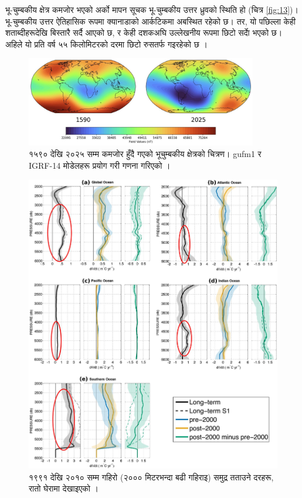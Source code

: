 \documentclass[10pt,twocolumn,letterpaper]{article}
\begin{document}
भू-चुम्बकीय क्षेत्र कमजोर भएको अर्को मापन सूचक भू-चुम्बकीय उत्तर ध्रुवको स्थिति हो (चित्र \ref{fig:13})। भू-चुम्बकीय उत्तर ऐतिहासिक रूपमा क्यानाडाको आर्कटिकमा अबस्थित रहेको छ। तर, यो पछिल्ला केही शताब्दीहरूदेखि बिस्तारै सर्दै आएको छ, र केही दशकअघि उल्लेखनीय रूपमा छिटो सर्दाे भएको छ। अहिले यो प्रति वर्ष ५५ किलोमिटरको दरमा छिटो रुसतर्फ गइरहेको छ \cite{124}।

\begin{figure}[t]
\begin{center}
\includegraphics[width=0.9\textwidth]{saa.jpg}
\end{center}
   \caption{१५९० देखि २०२५ सम्म कमजोर हुँदै गएको भूचुम्बकीय क्षेत्रको चित्रण। gufm1 र IGRF-14 मोडेलहरू प्रयोग गरी गणना गरिएको \cite{125,126}।}
\label{fig:14}
\end{figure}

\begin{figure}[t]
\begin{center}
   \includegraphics[width=1\linewidth]{ocean-highlight.jpg}
\end{center}
   \caption{१९९१ देखि २०१० सम्म गहिरो (२००० मिटरभन्दा बढी गहिराइ) समुद्र तताउने दरहरू, रातो घेरामा देखाइएको \cite{132}।}
\label{fig:15}
\label{fig:onecol}
\end{figure}
\end{document}
